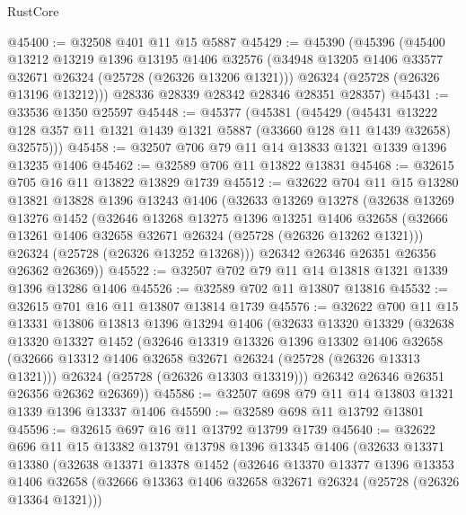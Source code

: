 \begin{lexlean}{RustCore}
\begin{coremodule}
@45400 := @32508 @401 @11 @15 @5887
@45429 := @45390
    (@45396
      (@45400
        @13212
        @13219
        @1396
        @13195
        @1406
        @32576
        (@34948 @13205 @1406 @33577 @32671 @26324 (@25728 (@26326 @13206 @1321)))
        @26324
        (@25728 (@26326 @13196 @13212)))
      @28336
      @28339
      @28342
      @28346
      @28351
      @28357)
@45431 := @33536 @1350 @25597
@45448 := @45377
    (@45381
      (@45429
        (@45431
          @13222
          @128
          @357
          @11
          @1321
          @1439
          @1321
          @5887
          (@33660 @128 @11 @1439 @32658)
          @32575)))
@45458 := @32507 @706 @79 @11 @14 @13833 @1321 @1339 @1396 @13235 @1406
@45462 := @32589 @706 @11 @13822 @13831
@45468 := @32615 @705 @16 @11 @13822 @13829 @1739
@45512 := @32622
    @704
    @11
    @15
    @13280
    @13821
    @13828
    @1396
    @13243
    @1406
    (@32633
      @13269
      @13278
      (@32638
        @13269
        @13276
        @1452
        (@32646
          @13268
          @13275
          @1396
          @13251
          @1406
          @32658
          (@32666 @13261 @1406 @32658 @32671 @26324 (@25728 (@26326 @13262 @1321)))
          @26324
          (@25728 (@26326 @13252 @13268)))
        @26342
        @26346
        @26351
        @26356
        @26362
        @26369))
@45522 := @32507 @702 @79 @11 @14 @13818 @1321 @1339 @1396 @13286 @1406
@45526 := @32589 @702 @11 @13807 @13816
@45532 := @32615 @701 @16 @11 @13807 @13814 @1739
@45576 := @32622
    @700
    @11
    @15
    @13331
    @13806
    @13813
    @1396
    @13294
    @1406
    (@32633
      @13320
      @13329
      (@32638
        @13320
        @13327
        @1452
        (@32646
          @13319
          @13326
          @1396
          @13302
          @1406
          @32658
          (@32666 @13312 @1406 @32658 @32671 @26324 (@25728 (@26326 @13313 @1321)))
          @26324
          (@25728 (@26326 @13303 @13319)))
        @26342
        @26346
        @26351
        @26356
        @26362
        @26369))
@45586 := @32507 @698 @79 @11 @14 @13803 @1321 @1339 @1396 @13337 @1406
@45590 := @32589 @698 @11 @13792 @13801
@45596 := @32615 @697 @16 @11 @13792 @13799 @1739
@45640 := @32622
    @696
    @11
    @15
    @13382
    @13791
    @13798
    @1396
    @13345
    @1406
    (@32633
      @13371
      @13380
      (@32638
        @13371
        @13378
        @1452
        (@32646
          @13370
          @13377
          @1396
          @13353
          @1406
          @32658
          (@32666 @13363 @1406 @32658 @32671 @26324 (@25728 (@26326 @13364 @1321)))

\end{coremodule}
\end{lexlean}
